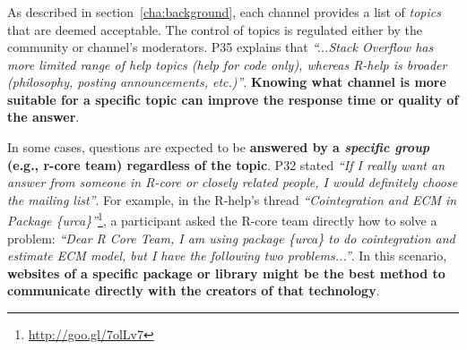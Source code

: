 \subsubsection{\reca}


    As described in section~\ref{cha:background}, each channel provides a list of \textit{topics} that are deemed acceptable.
    The control of topics is regulated either by the community or channel's moderators.
    P35 explains that \textit{``...Stack Overflow has more limited range of help topics (help for code only), whereas R-help is broader (philosophy, posting announcements, etc.)''}.
    \textbf{Knowing what channel is more suitable for a specific topic can improve the response time or quality of the answer}.


    In some cases, questions are expected to be \textbf{answered by a \textit{specific group} (e.g., r-core team) regardless of the topic}.
    P32 stated \textit{``If I really want an answer from someone in R-core or closely related people, I would definitely choose the mailing list''}.
    For example, in the R-help's thread \textit{``Cointegration and ECM in Package \{urca\}''}\footnote{\url{http://goo.gl/7olLv7}}, a participant asked the R-core team directly how to solve a problem: \textit{``Dear R Core Team, I am using package \{urca\} to do cointegration and estimate ECM model, but I have the following two problems...''}.
    In this scenario, \textbf{websites of a specific package or library might be the best method to communicate directly with the creators of that technology}.
     



